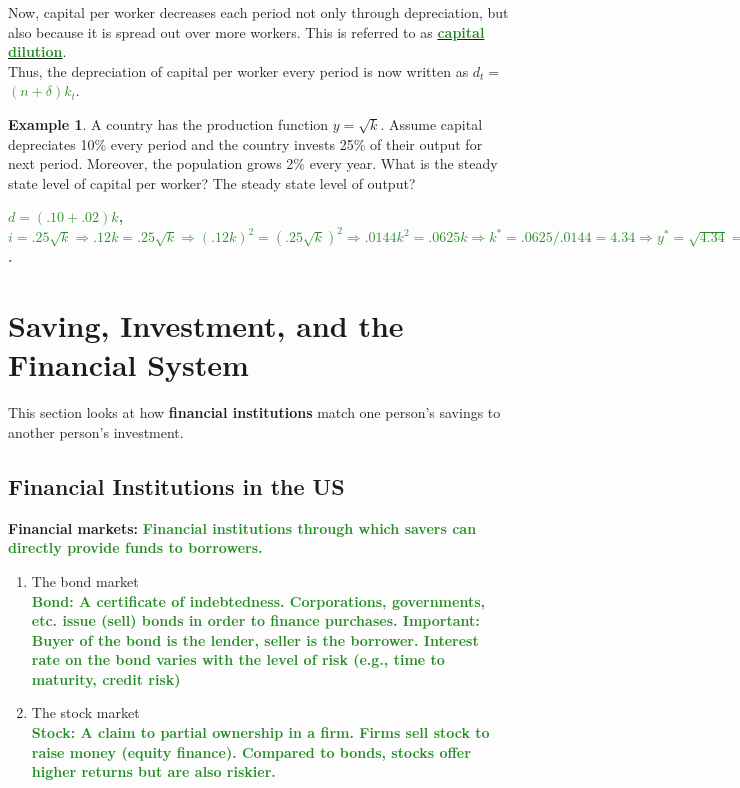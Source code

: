 \documentclass[11pt]{article}\usepackage[]{graphicx}\usepackage[]{color}
\theoremstyle{definition}
\newtheorem{exmp}{Example}[section]
\newcommand{\blank}[1]{}
\newcommand{\ddp}[1]{{\textbf{\textcolor{ForestGreen}{#1}}}}
\newcommand{\dd}[1]{{\underline{\textbf{\textcolor{ForestGreen}{#1}}}}}
\newcommand{\defn}[1]{\textbf{#1}}
\begin{document}
Now, capital per worker decreases each period not only through depreciation, but also because it is spread out over more workers. This is referred to as \dd{capital dilution}. 
\\

Thus, the depreciation of capital per worker every period is now written as $d_t = $ \dd{$(n + \delta)k_t$}.
\\

\begin{exmp} 
A country has the production function $y = \sqrt{k}$. Assume capital depreciates 10\% every period and the country invests 25\% of their output for next period. Moreover, the population grows 2\% every year. What is the steady state level of capital per worker? The steady state level of output?
\end{exmp}
\ddp{$d = (.10+.02)k$, $i=.25\sqrt{k} \Rightarrow .12k = .25\sqrt{k} \Rightarrow (.12k)^2 = (.25\sqrt{k})^2 \Rightarrow .0144k^2 = .0625k \Rightarrow k^* = .0625/.0144 = 4.34 \Rightarrow y^* = \sqrt{4.34} = 2.08$.}
\blank{}
\blank{}

\newpage

\section{Saving, Investment, and the Financial System}

This section looks at how \textbf{financial institutions} match one person's savings to another person's investment. 

\subsection{Financial Institutions in the US}

\defn{Financial markets:} \ddp{Financial institutions through which savers can directly provide funds to borrowers.}

\begin{enumerate}
	\setlength{\itemsep}{1.5em}
	\item The bond market 
	\ddp{\\Bond: A certificate of indebtedness. Corporations, governments, etc. issue (sell) bonds in order to finance purchases. Important: Buyer of the bond is the lender, seller is the borrower. Interest rate on the bond varies with the level of risk (e.g., time to maturity, credit risk)}
	\item The stock market
	\ddp{\\Stock: A claim to partial ownership in a firm. Firms sell stock to raise money (equity finance). Compared to bonds, stocks offer higher returns but are also riskier.}
	
\end{enumerate}
\vspace{2em}
\end{document}
